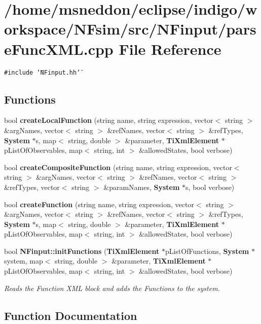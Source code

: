 \section{/home/msneddon/eclipse/indigo/workspace/NFsim/src/NFinput/parseFuncXML.cpp File Reference}
\label{parseFuncXML_8cpp}


{\tt \#include \char`\"{}NFinput.hh\char`\"{}}\par
\subsection*{Functions}
\begin{CompactItemize}
\item 
bool {\bf createLocalFunction} (string name, string expression, vector$<$ string $>$ \&argNames, vector$<$ string $>$ \&refNames, vector$<$ string $>$ \&refTypes, {\bf System} $\ast$s, map$<$ string, double $>$ \&parameter, {\bf TiXmlElement} $\ast$pListOfObservables, map$<$ string, int $>$ \&allowedStates, bool verbose)
\item 
bool {\bf createCompositeFunction} (string name, string expression, vector$<$ string $>$ \&argNames, vector$<$ string $>$ \&refNames, vector$<$ string $>$ \&refTypes, vector$<$ string $>$ \&paramNames, {\bf System} $\ast$s, bool verbose)
\item 
bool {\bf createFunction} (string name, string expression, vector$<$ string $>$ \&argNames, vector$<$ string $>$ \&refNames, vector$<$ string $>$ \&refTypes, {\bf System} $\ast$s, map$<$ string, double $>$ \&parameter, {\bf TiXmlElement} $\ast$pListOfObservables, map$<$ string, int $>$ \&allowedStates, bool verbose)
\item 
bool {\bf NFinput::initFunctions} ({\bf TiXmlElement} $\ast$pListOfFunctions, {\bf System} $\ast$system, map$<$ string, double $>$ \&parameter, {\bf TiXmlElement} $\ast$pListOfObservables, map$<$ string, int $>$ \&allowedStates, bool verbose)
\begin{CompactList}\small\item\em Reads the Function XML block and adds the Functions to the system. \item\end{CompactList}\end{CompactItemize}


\subsection{Function Documentation}
